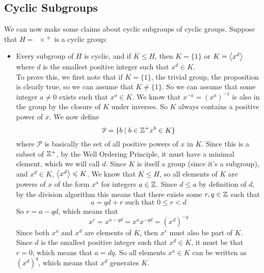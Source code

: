 \documentclass[12pt]{article}
\begin{document}
    \subsection*{Cyclic Subgroups}

    We can now make some claims about cyclic subgroups of
    cyclic groups.
    Suppose that $H = \ang{x}$ is a cyclic group:
    \begin{itemize}[label=$\diamond$]
        \item 
            Every subgroup of $H$ is cyclic,
            and if $K \leqslant H$,
            then $K = \{1\}$
            or $K = \left\langle x^d \right\rangle$
            where $d$ is the smallest positive integer
            such that $x^d \in K$. \\
            To prove this, we first note that
            if $K = \{1\}$, the trivial group,
            the proposition is clearly true,
            so we can assume that $K \neq \{1\}$.
            So we can assume that some integer $a \neq 0$
            exists such that $x^a \in K$.
            We know that $x^{-a} = (x^a)^{-1}$ is also in the group
            by the closure of $K$ under inverses.
            So $K$ always contains a positive power of $x$.
            We now define
            \[ \mathcal{P} = \{ b \mid b \in \mathbb{Z}^+ x^b \in K \} \]
            where $\mathcal{P}$ is basically the set of
            all positive powers of $x$ in $K$.
            Since this is a subset of $\mathbb{Z}^+$,
            by the Well Ordering Principle, 
            it must have a minimal element,
            which we will call $d$.
            Since $K$ is itself a group (since it's a subgroup),
            and $x^d \in K$,
            $\left\langle x^d \right\rangle \leqslant K$.
            We know that $K \leqslant H$,
            so all elements of $K$ are powers of $x$ of the form $x^a$
            for integers $a \in \mathbb{Z}$.
            Since $d \leqslant a$ by definition of $d$,
            by the division algorithm this means that 
            there exists some $r, q \in \mathbb{Z}$ such that
            \[ a = qd + r \text{ such that } 0 \leqslant r < d \]
            So $r = a - qd$,
            which means that
            \[ x^r = x^{a - qd} = x^ax^{-qd} = (x^d)^{-q} \]
            Since both $x^a$ and $x^d$ are elements of $K$,
            then $x^r$ must also be part of $K$.
            Since $d$ is the smallest positive integer
            such that $x^d \in K$,
            it must be that $r = 0$,
            which means that $a = dq$.
            So all elements $x^a \in K$ can be written as $(x^d)^q$,
            which means that $x^d$ generates $K$.

\end{itemize}
\end{document}

